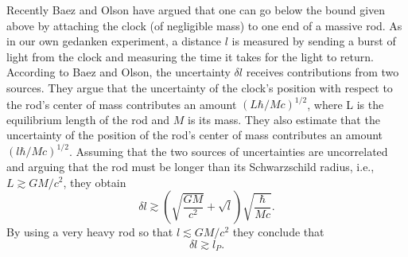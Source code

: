 \documentclass[preprint2]{aastex}
\begin{document}
Recently Baez and Olson\citep{bae02} have argued that one can go below the
bound given above by attaching the clock (of negligible mass) to one end of
a
massive rod.  As in our own gedanken experiment, a distance $l$
is measured by
sending a burst of light from the clock and measuring the time it takes for
the light to return.  According to Baez and Olson, the uncertainty
$\delta l$ receives contributions from two sources.  They
argue that the uncertainty
of the clock's position with respect to the rod's center of mass
contributes an amount $(L \hbar / Mc)^{1/2}$, where L is the equilibrium
length of the rod and $M$ is its mass.  They also estimate that the
uncertainty of the position of the rod's center of mass contributes an
amount $(l \hbar /Mc)^{1/2}$.  Assuming that the two sources of
uncertainties are uncorrelated and arguing that the rod must be longer
than its Schwarzschild radius, i.e., $L \gtrsim GM/c^2$, they obtain
\begin{equation}
\delta l \gtrsim \left(\sqrt{\frac{GM}{c^2}} + \sqrt{l} \right)
\sqrt{\frac{\hbar}{Mc}}.
\label{BO1}
\end{equation}
By using a very heavy rod so that $l \lesssim GM/c^2$ they conclude that
\begin{equation}
\delta l \gtrsim l_P.
\label{BO2}
\end{equation}
\end{document}
